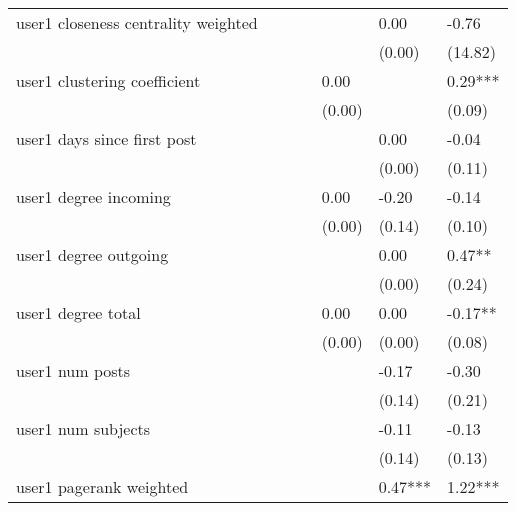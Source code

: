 \begin{table}
\begin{center}
\begin{tabular}{lllllll}
user1 closeness centrality weighted            &          &         &         &         & 0.00         & -0.76         \\
                                               &          &         &         &         & (0.00)       & (14.82)       \\
user1 clustering coefficient                   &          &         &         & 0.00    &              & 0.29***       \\
                                               &          &         &         & (0.00)  &              & (0.09)        \\
user1 days since first post                    &          &         &         &         & 0.00         & -0.04         \\
                                               &          &         &         &         & (0.00)       & (0.11)        \\
user1 degree incoming                          &          &         &         & 0.00    & -0.20        & -0.14         \\
                                               &          &         &         & (0.00)  & (0.14)       & (0.10)        \\
user1 degree outgoing                          &          &         &         &         & 0.00         & 0.47**        \\
                                               &          &         &         &         & (0.00)       & (0.24)        \\
user1 degree total                             &          &         &         & 0.00    & 0.00         & -0.17**       \\
                                               &          &         &         & (0.00)  & (0.00)       & (0.08)        \\
user1 num posts                                &          &         &         &         & -0.17        & -0.30         \\
                                               &          &         &         &         & (0.14)       & (0.21)        \\
user1 num subjects                             &          &         &         &         & -0.11        & -0.13         \\
                                               &          &         &         &         & (0.14)       & (0.13)        \\
user1 pagerank weighted                        &          &         &         &         & 0.47***      & 1.22***       \\

\end{tabular}
\end{center}
\end{table}
